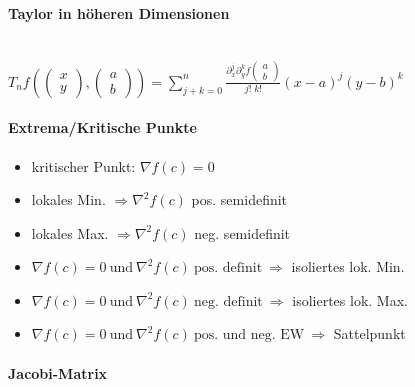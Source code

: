 \documentclass[paper=a3,paper=landscape, fontsize=9pt, DIV=30]{scrartcl}
\begin{document}
\begin{multicols*}{4}
 \paragraph{Taylor in höheren Dimensionen}\hspace{0pt}\\
 $T_nf((\begin{smallmatrix} x\\y \end{smallmatrix}), (\begin{smallmatrix} a\\b \end{smallmatrix})) = \sum_{j+k=0}^{n} \frac{\partial_x^j\partial_y^kf(\begin{smallmatrix} a\\b \end{smallmatrix})}{j! \; k!} (x-a)^j(y-b)^k$

  \paragraph{Extrema/Kritische Punkte}
  \begin{itemize}
  	\item kritischer Punkt: $\nabla f(c) = 0$
  	\item lokales Min. $\Rightarrow \nabla^2f(c)$ pos. semidefinit
  	\item lokales Max. $ \Rightarrow \nabla^2f(c)$ neg. semidefinit
  	\item $\nabla f(c)=0 \ \text{und}\ \nabla^2f(c) \ \text{pos. definit}\ \Rightarrow$ isoliertes lok. Min.
  	\item  $\nabla f(c)=0 \ \text{und}\ \nabla^2f(c) \ \text{neg. definit}\ \Rightarrow$ isoliertes lok. Max.
  	\item $\nabla f(c)=0 \ \text{und}\ \nabla^2f(c) \ \text{pos. und neg. EW}\ \Rightarrow$ Sattelpunkt
  \end{itemize}

  \paragraph{Jacobi-Matrix}


\end{multicols*}
\end{document}
